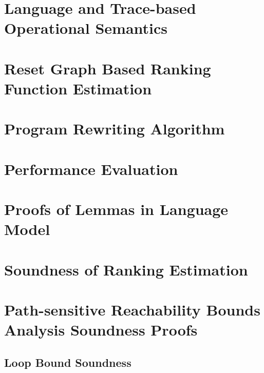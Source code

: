 \section{Language and Trace-based Operational Semantics}
\label{apdx:language}

\clearpage

\section{Reset Graph Based Ranking Function Estimation}
\label{apdx:alg-resetgraph}

\clearpage

\section{Program Rewriting Algorithm}
\label{apdx:alg-rewrite}

\clearpage


\section{Performance Evaluation}
\label{apdx:eval-performance}



\clearpage

\section{Proofs of Lemmas in Language Model}
\label{apdx:lem_language}

\clearpage
% 
\section{Soundness of Ranking Estimation}
\label{apdx:pathinsensitive_rb_soundness}

\clearpage

\section{Path-sensitive Reachability Bounds Analysis Soundness Proofs}
\label{apdx:pathsensitive_rb_soundness}

\subsection{Loop Bound Soundness}
\label{apdx:loopbound-sound}

\clearpage

